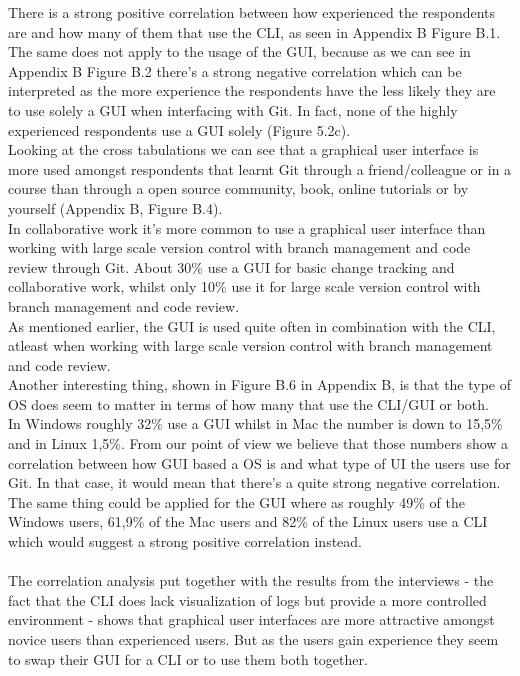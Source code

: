 \documentclass[a4paper,oneside]{bth} %
\begin{document}
				There is a strong positive correlation between how experienced the respondents are and how many of them that use the CLI, as seen in Appendix B Figure B.1.
				The same does not apply to the usage of the GUI, because as we can see in Appendix B Figure B.2 there's a strong negative correlation which can be interpreted as the more experience the respondents have the less likely they are to use solely a GUI when interfacing with Git. In fact, none of the highly experienced respondents use a GUI solely (Figure 5.2c).
				\\
				Looking at the cross tabulations we can see that a graphical user interface is more used amongst respondents that learnt Git through a friend/colleague or in a course than through a open source community, book, online tutorials or by yourself (Appendix B, Figure B.4).\\
				In collaborative work it's more common to use a graphical user interface than working with large scale version control with branch management and code review through Git. About 30\% use a GUI for basic change tracking and collaborative work, whilst only 10\% use it for large scale version control with branch management and code review.\\
				As mentioned earlier, the GUI is used quite often in combination with the CLI, atleast when working with large scale version control with branch management and code review.\\
				Another interesting thing, shown in Figure B.6 in Appendix B, is that the type of OS does seem to matter in terms of how many that use the CLI/GUI or both.\\
				In Windows roughly 32\% use a GUI whilst in Mac the number is down to 15,5\% and in Linux 1,5\%.
				From our point of view we believe that those numbers show a correlation between how GUI based a OS is and what type of UI the users use for Git. In that case, it would mean that there's a quite strong negative correlation.
				The same thing could be applied for the GUI where as roughly 49\% of the Windows users, 61,9\% of the Mac users and 82\% of the Linux users use a CLI which would suggest a strong positive correlation instead.\\\\			
				The correlation analysis put together with the results from the interviews - the fact that the CLI does lack visualization of logs but provide a more controlled environment - shows that graphical user interfaces are more attractive amongst novice users than experienced users.
				But as the users gain experience they seem to swap their GUI for a CLI or to use them both together.\\
\end{document}
